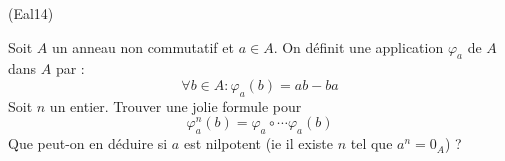 \begin{tiny}(Eal14)\end{tiny} Soit $A$ un anneau non commutatif et $a\in A$. On définit une application $\varphi_a$ de $A$ dans $A$ par :
\begin{displaymath}
 \forall b\in A : \varphi_a(b) = ab-ba
\end{displaymath}
Soit $n$ un entier. Trouver une jolie formule pour $$\varphi_a^n(b)=\varphi_a\circ\cdots \varphi_a(b)$$ Que peut-on en déduire si $a$ est nilpotent (ie il existe $n$ tel que $a^n=0_A$) ?